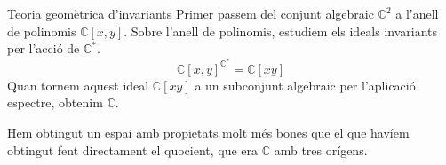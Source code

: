 \documentclass{beamer}
\theoremstyle{definition}
\begin{document}
\begin{frame}{Teoria geom\`{e}trica d'invariants}
Primer passem del conjunt algebraic $\mathbb{C}^2$ a l'anell de polinomis $\mathbb{C}[x,y]$. Sobre l'anell de polinomis, estudiem els ideals invariants per l'acci\'{o} de $\mathbb{C}^*$.
\pause
\[\mathbb{C}[x,y]^{\mathbb{C}^*}=\mathbb{C}[xy]\] Quan tornem aquest ideal $\mathbb{C}[xy]$ a un subconjunt algebraic per l'aplicaci\'{o} espectre, obtenim $\mathbb{C}$.
\pause

Hem obtingut un espai amb propietats molt m\'{e}s bones que el que hav\'{i}em obtingut fent directament el quocient, que era $\mathbb{C}$ amb tres or\'{i}gens.
\end{frame}
\end{document}
